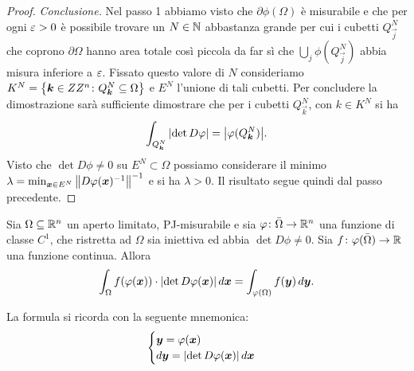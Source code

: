\begin{proof}
\emph{Conclusione.} 
Nel passo 1 abbiamo visto che $\partial \phi(\Omega)$ è misurabile 
e che per ogni $\varepsilon>0$ è possibile trovare un $N\in {\mathbb N}$ abbastanza grande 
per cui i cubetti $Q^N_{\vec j}$ che coprono $\partial \Omega$ hanno 
area totale così piccola da far sì che $\bigcup_j \phi(Q^N_{\vec j})$ 
abbia misura inferiore a $\varepsilon$.
Fissato questo valore di $N$ consideriamo 
$K^N = {\left\{ \boldsymbol k \in ZZ^n\colon Q^N_{\boldsymbol k}\subseteq \Omega \right\}}$
e $E^N$ l'unione di tali cubetti.
Per concludere la dimostrazione sarà sufficiente dimostrare che per i 
cubetti $Q^N_{\vec k}$, con $k\in K^N$ si ha 
\[
  \int_{Q^N_{\boldsymbol k}} {\left|\det D\varphi\right|} = {\left|\varphi(Q^N_{\boldsymbol k})\right|}.
\]
Visto che $\det D\phi \neq 0$ su $E^N\subset \Omega$ possiamo considerare 
il minimo $\lambda = \min_{\boldsymbol x \in E^N} {\left\Vert D\varphi(\boldsymbol x)^{-1}\right\Vert}^{-1}$ 
e si ha $\lambda>0$.
Il risultato segue quindi dal passo precedente.
\end{proof}

\begin{theorem}
Sia $\Omega\subseteq {\mathbb R}^n$ un aperto limitato, PJ-misurabile e 
sia $\varphi\colon \bar \Omega \to {\mathbb R}^n$
una funzione di classe $C^1$,
che ristretta ad $\Omega$ sia iniettiva ed abbia $\det D\phi\neq 0$. 
Sia  $f\colon \varphi(\bar \Omega)\to {\mathbb R}$ una funzione 
continua. Allora
\[
    \int_\Omega f(\varphi(\boldsymbol x))\cdot {\left|\det D \varphi(\boldsymbol x)\right|}\, d \boldsymbol x
    =
    \int_{\varphi(\Omega)} f(\boldsymbol y) \, d \boldsymbol y.
\]

La formula si ricorda con la seguente mnemonica:
\[
\begin{cases}
   \boldsymbol y = \varphi(\boldsymbol x)\\
   d {\boldsymbol y} = {\left|\det D\varphi(\boldsymbol x)\right|}\, d\boldsymbol x
\end{cases}
\]
\end{theorem}

